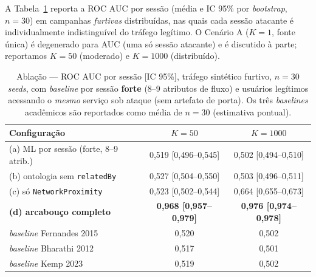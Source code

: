 \documentclass[preprint,12pt]{elsarticle}
\begin{document}
A Tabela~\ref{tab:ablation} reporta a ROC AUC por sessão (média e IC 95\% por \emph{bootstrap}, $n = 30$) em campanhas \emph{furtivas} distribuídas, nas quais cada sessão atacante é individualmente indistinguível do tráfego legítimo. O Cenário A ($K = 1$, fonte única) é degenerado para AUC (uma só sessão atacante) e é discutido à parte; reportamos $K = 50$ (moderado) e $K = 1000$ (distribuído).

\begin{table}[ht]
\centering
\caption{Ablação --- ROC AUC por sessão [IC 95\%], tráfego sintético furtivo, $n=30$ \emph{seeds}, com \emph{baseline} por sessão \textbf{forte} (8--9 atributos de fluxo) e usuários legítimos acessando o \emph{mesmo} serviço sob ataque (sem artefato de porta). Os três \emph{baselines} acadêmicos são reportados como média de $n=30$ (estimativa pontual).}
\label{tab:ablation}
\begin{tabular}{lcc}
\toprule
Configuração & $K = 50$ & $K = 1000$ \\
\midrule
(a) ML por sessão (forte, 8--9 atrib.) & 0,519 [0,496--0,545] & 0,502 [0,494--0,510] \\
(b) ontologia sem \texttt{relatedBy} & 0,527 [0,504--0,550] & 0,503 [0,496--0,511] \\
(c) só \texttt{NetworkProximity} & 0,523 [0,502--0,544] & 0,664 [0,655--0,673] \\
\textbf{(d) arcabouço completo} & \textbf{0,968 [0,957--0,979]} & \textbf{0,976 [0,974--0,978]} \\
\midrule
\emph{baseline} Fernandes 2015 & 0,520 & 0,502 \\
\emph{baseline} Bharathi 2012 & 0,517 & 0,501 \\
\emph{baseline} Kemp 2023 & 0,519 & 0,502 \\
\bottomrule
\end{tabular}
\end{table}
\end{document}
